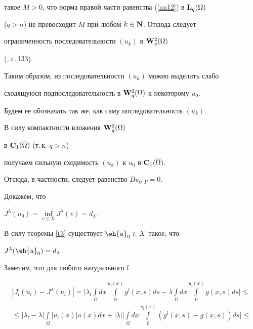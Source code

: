 \begin{pf}
такое $M>0$, что норма правой части равенства (\ref{nn12}) в ${\bold L}_q(\Omega)$


($q>n$) не превосходит $M$ при любом $k\in {\bold N}$. Отсюда следует


ограниченность последовательности $(u_k)$ в ${\bold W}_q^2(\Omega)$ 


(\cite{agmon}, с.\,133).


Таким образом, из последовательности $(u_k)$ можно выделить слабо


сходящуюся подпоследовательность в ${\bold W}_q^2(\Omega)$ к некоторому $u_0$.


Будем ее обозначать так же, как саму последовательность $(u_k)$.


В силу компактности вложения ${\bold W}_q^2(\Omega)$ 


в ${\bold C}_1(\overline{\Omega})$ (т.\,к. $q>n$)


получаем сильную сходимость $(u_k)$ к $u_0$ в ${\bold C}_1(\overline{\Omega})$.


Отсюда, в частности, следует равенство $Bu_0\vert{}_{\Gamma}=0$.





Докажем, что


$J^\lambda(u_0)=\inf\limits_{v\in X}J^\lambda(v)=d_\lambda$.


В силу теоремы \ref{t3} существует $\wh{u}_0\in X$ такое, что


$J^\lambda(\wh{u}_0)=d_\lambda$.





Заметим, что для любого натурального $l$


\begin{multline*}


|J_l(u_l)-J^\lambda(u_l)|=


\bigg|\lambda_l\int\limits_{\Omega}dx\int\limits_0^{u_l(x)}g^l(x, s)ds-


\lambda\int\limits_{\Omega}dx\int\limits_0^{u_l(x)}g(x, s)ds\bigg|\leq \\


%


\le |\lambda_l-\lambda|\int\limits_{\Omega}|u_l(x)|a(x)dx+|\lambda|


\bigg|\int\limits_{\Omega}dx\int\limits_0^{u_l(x)}


(g^l(x, s)-g(x, s))ds\bigg|\leq \\


% 



\end{multline*}
\end{pf}
